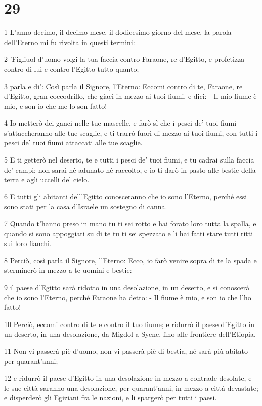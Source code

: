\chapter{29}

\par 1 L'anno decimo, il decimo mese, il dodicesimo giorno del mese, la parola dell'Eterno mi fu rivolta in questi termini:
\par 2 'Figliuol d'uomo volgi la tua faccia contro Faraone, re d'Egitto, e profetizza contro di lui e contro l'Egitto tutto quanto;
\par 3 parla e di': Così parla il Signore, l'Eterno: Eccomi contro di te, Faraone, re d'Egitto, gran coccodrillo, che giaci in mezzo ai tuoi fiumi, e dici: - Il mio fiume è mio, e son io che me lo son fatto!
\par 4 Io metterò dei ganci nelle tue mascelle, e farò sì che i pesci de' tuoi fiumi s'attaccheranno alle tue scaglie, e ti trarrò fuori di mezzo ai tuoi fiumi, con tutti i pesci de' tuoi fiumi attaccati alle tue scaglie.
\par 5 E ti getterò nel deserto, te e tutti i pesci de' tuoi fiumi, e tu cadrai sulla faccia de' campi; non sarai né adunato né raccolto, e io ti darò in pasto alle bestie della terra e agli uccelli del cielo.
\par 6 E tutti gli abitanti dell'Egitto conosceranno che io sono l'Eterno, perché essi sono stati per la casa d'Israele un sostegno di canna.
\par 7 Quando t'hanno preso in mano tu ti sei rotto e hai forato loro tutta la spalla, e quando si sono appoggiati su di te tu ti sei spezzato e li hai fatti stare tutti ritti sui loro fianchi.
\par 8 Perciò, così parla il Signore, l'Eterno: Ecco, io farò venire sopra di te la spada e sterminerò in mezzo a te uomini e bestie:
\par 9 il paese d'Egitto sarà ridotto in una desolazione, in un deserto, e si conoscerà che io sono l'Eterno, perché Faraone ha detto: - Il fiume è mio, e son io che l'ho fatto! -
\par 10 Perciò, eccomi contro di te e contro il tuo fiume; e ridurrò il paese d'Egitto in un deserto, in una desolazione, da Migdol a Syene, fino alle frontiere dell'Etiopia.
\par 11 Non vi passerà piè d'uomo, non vi passerà piè di bestia, né sarà più abitato per quarant'anni;
\par 12 e ridurrò il paese d'Egitto in una desolazione in mezzo a contrade desolate, e le sue città saranno una desolazione, per quarant'anni, in mezzo a città devastate; e disperderò gli Egiziani fra le nazioni, e li spargerò per tutti i paesi.
